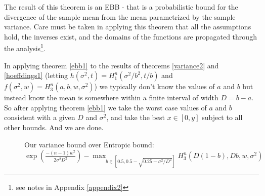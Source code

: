 \documentclass[aap,preprint]{imsart}
\begin{document}
The result of this theorem is an EBB - that is a probabilistic bound for the divergence of the sample mean from the mean parametrized by the sample variance. Care must be taken in applying this theorem that all the assumptions hold, the inverses exist, and the domains of the functions are propagated through the analysis\footnote{see notes in Appendix \ref{appendix2}}.

In applying theorem \ref{ebb1} to the results of theorems \ref{variance2} and \ref{hoeffdings1} (letting $h(\sigma^2,t)=H_1^n\left(\sigma^2/b^2,t/b\right)$ and $f(\sigma^2,w)=H_3^n(a,b,w,\sigma^2)$) we typically don't know the values of $a$ and $b$ but instead know the mean is somewhere within a finite interval of width $D=b-a$.
So after applying theorem \ref{ebb1} we take the worst case values of $a$ and $b$ consistent with a given $D$ and $\sigma^2$, and take the best $x\in[0,y]$ subject to all other bounds.
And we are done.

\begin{figure}[h]
\centering
\captionsetup{justification=centering,margin=0.01cm}
\caption{Our variance bound over Entropic bound:\\$\scriptstyle\exp\left(\frac{-(n-1)w^2}{2\sigma^2D^2}\right)-\max_{b\in\left[0.5,0.5-\sqrt{0.25-\sigma^2/D^2}\right]}H_3^n\left(D(1-b),Db,w,\sigma^2\right)$}
\label{biggraph2}
\end{figure}
\end{document}
